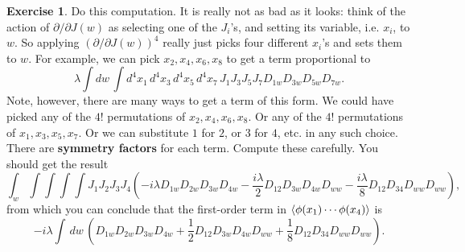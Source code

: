\documentclass{report}
\theoremstyle{plain}
\theoremstyle{definition}
\newtheorem{exercise}{Exercise}[section]
\theoremstyle{remark}
\begin{document}
\begin{exercise}
  Do this computation. It is really not as bad as it looks: think of
  the action of $\partial/\partial J(w)$ as selecting one of the
  $J_i$'s, and setting its variable, i.e. $x_i$, to $w$. So applying
  $(\partial/\partial J(w))^4$ really just picks four different
  $x_i$'s and sets them to $w$. For example, we can pick
  $x_2, x_4, x_6, x_8$ to get a term proportional to
  $$ \lambda \int dw \, \int d^4x_1 \, d^4x_3 \, d^4x_5 \, d^4x_7 \, J_1J_3J_5J_7 D_{1w} D_{3w} D_{5w} D_{7w}. $$
  Note, however, there are many ways to get a term of this form. We
  could have picked any of the $4!$ permutations of
  $x_2, x_4, x_6, x_8$. Or any of the $4!$ permutations of
  $x_1, x_3, x_5, x_7$. Or we can substitute $1$ for $2$, or $3$ for
  $4$, etc. in any such choice. There are {\bf symmetry factors} for
  each term. Compute these carefully. You should get the result
  $$ \int_w \int\int\int\int J_1 J_2 J_3 J_4 \left(-i\lambda D_{1w} D_{2w} D_{3w} D_{4w} - \frac{i\lambda}{2} D_{12}D_{3w}D_{4w}D_{ww} - \frac{i\lambda}{8} D_{12} D_{34} D_{ww} D_{ww}\right), $$
  from which you can conclude that the first-order term in
  $\braket{\phi(x_1)\cdots \phi(x_4)}$ is
  $$ -i\lambda \int \, dw \, \left(D_{1w} D_{2w} D_{3w} D_{4w} + \frac{1}{2} D_{12}D_{3w}D_{4w}D_{ww} + \frac{1}{8} D_{12} D_{34} D_{ww} D_{ww}\right). $$
\end{exercise}
\end{document}
